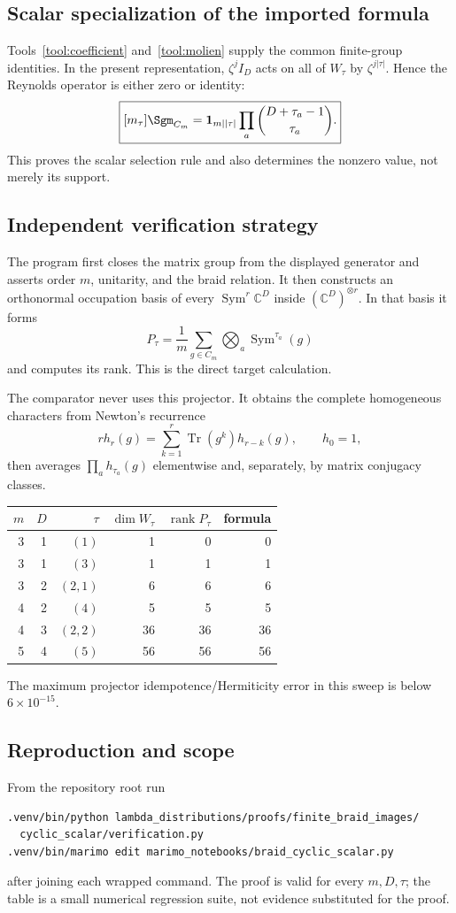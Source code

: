 \documentclass[10pt]{article}
\begin{document}
\subsection{Scalar specialization of the imported formula}
Tools~\ref{tool:coefficient} and~\ref{tool:molien} supply the common
finite-group identities.  In the present representation, $\zeta^jI_D$ acts
on all of $W_\tau$ by
$\zeta^{j|\tau|}$.  Hence the Reynolds operator is either zero or identity:
\[
 \boxed{[m_\tau]\Sgm_{C_m}=\mathbf1_{m\mid|\tau|}
 \prod_a\binom{D+\tau_a-1}{\tau_a}.}
\]
This proves the scalar selection rule and also determines the nonzero value,
not merely its support.

\subsection{Independent verification strategy}
The program first closes the matrix group from the displayed generator and
asserts order $m$, unitarity, and the braid relation.  It then constructs an
orthonormal occupation basis of every $\operatorname{Sym}^{r}\mathbb C^D$
inside $(\mathbb C^D)^{\otimes r}$.  In that basis it forms
\[
 P_\tau=\frac1m\sum_{g\in C_m}\bigotimes_a\operatorname{Sym}^{\tau_a}(g)
\]
and computes its rank.  This is the direct target calculation.

The comparator never uses this projector.  It obtains the complete
homogeneous characters from Newton's recurrence
\[
 r h_r(g)=\sum_{k=1}^r\operatorname{Tr}(g^k)h_{r-k}(g),\qquad h_0=1,
\]
then averages $\prod_a h_{\tau_a}(g)$ elementwise and, separately, by
matrix conjugacy classes.

\begin{center}
\begin{tabular}{@{}rrrrrr@{}}\toprule
$m$&$D$&$\tau$&$\dim W_\tau$&$\operatorname{rank}P_\tau$&formula\\\midrule
3&1&$(1)$&1&0&0\\
3&1&$(3)$&1&1&1\\
3&2&$(2,1)$&6&6&6\\
4&2&$(4)$&5&5&5\\
4&3&$(2,2)$&36&36&36\\
5&4&$(5)$&56&56&56\\\bottomrule
\end{tabular}
\end{center}
The maximum projector idempotence/Hermiticity error in this sweep is below
$6\times10^{-15}$.

\subsection{Reproduction and scope}
From the repository root run
\begin{verbatim}
.venv/bin/python lambda_distributions/proofs/finite_braid_images/
  cyclic_scalar/verification.py
.venv/bin/marimo edit marimo_notebooks/braid_cyclic_scalar.py
\end{verbatim}
after joining each wrapped command.  The proof is valid for every $m,D,\tau$;
the table is a small numerical regression suite, not evidence substituted for
the proof.
\endgroup
\end{document}
